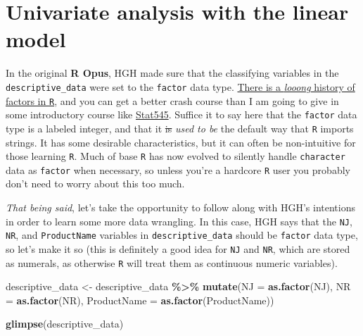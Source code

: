 \documentclass[
]{book}
\newenvironment{Shaded}{\begin{snugshade}}{\end{snugshade}}
\newcommand{\AttributeTok}[1]{\textcolor[rgb]{0.13,0.29,0.53}{#1}}
\newcommand{\FunctionTok}[1]{\textcolor[rgb]{0.13,0.29,0.53}{\textbf{#1}}}
\newcommand{\NormalTok}[1]{#1}
\newcommand{\OtherTok}[1]{\textcolor[rgb]{0.56,0.35,0.01}{#1}}
\newcommand{\SpecialCharTok}[1]{\textcolor[rgb]{0.81,0.36,0.00}{\textbf{#1}}}
\begin{document}
\section{Univariate analysis with the linear model}\label{univariate-analysis-with-the-linear-model}

In the original \textbf{R Opus}, HGH made sure that the classifying variables in the \texttt{descriptive\_data} were set to the \texttt{factor} data type. \href{https://notstatschat.tumblr.com/post/124987394001/stringsasfactors-sigh}{There is a \emph{looong} history of factors in \texttt{R}}, and you can get a better crash course than I am going to give in some introductory course like \href{https://stat545.com/factors-boss.html}{Stat545}. Suffice it to say here that the \texttt{factor} data type is a labeled integer, and that it \st{is} \emph{used to be} the default way that \texttt{R} imports strings. It has some desirable characteristics, but it can often be non-intuitive for those learning \texttt{R}. Much of base \texttt{R} has now evolved to silently handle \texttt{character} data as \texttt{factor} when necessary, so unless you're a hardcore \texttt{R} user you probably don't need to worry about this too much.

\emph{That being said}, let's take the opportunity to follow along with HGH's intentions in order to learn some more data wrangling. In this case, HGH says that the \texttt{NJ}, \texttt{NR}, and \texttt{ProductName} variables in \texttt{descriptive\_data} should be \texttt{factor} data type, so let's make it so (this is definitely a good idea for \texttt{NJ} and \texttt{NR}, which are stored as numerals, as otherwise \texttt{R} will treat them as continuous numeric variables).

\begin{Shaded}
\begin{Highlighting}[]
\NormalTok{descriptive\_data }\OtherTok{\textless{}{-}} 
\NormalTok{  descriptive\_data }\SpecialCharTok{\%\textgreater{}\%}
  \FunctionTok{mutate}\NormalTok{(}\AttributeTok{NJ =} \FunctionTok{as.factor}\NormalTok{(NJ),}
         \AttributeTok{NR =} \FunctionTok{as.factor}\NormalTok{(NR),}
         \AttributeTok{ProductName =} \FunctionTok{as.factor}\NormalTok{(ProductName))}

\FunctionTok{glimpse}\NormalTok{(descriptive\_data)}
\end{Highlighting}
\end{Shaded}
\end{document}
